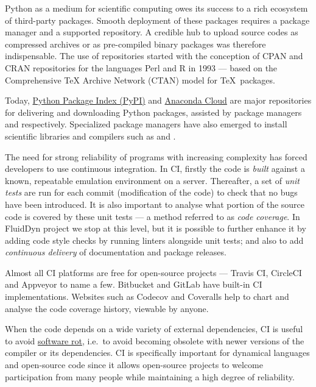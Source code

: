  Python
as a medium for scientific computing owes its success to a rich ecosystem of
third-party packages.  Smooth deployment of these packages requires a package
manager and a supported repository. A credible hub to upload source codes as
compressed archives or as pre-compiled binary packages was therefore
indispensable. The use of repositories started with the conception of CPAN and
CRAN repositories for the languages Perl and R in 1993 --- based on the
Comprehensive TeX Archive Network (CTAN) model for \TeX\ packages. 

Today, \href{https://pypi.org}{Python Package Index (PyPI)} and
\href{https://anaconda.org}{Anaconda Cloud} are major repositories for
delivering and downloading Python packages, assisted by package managers
 and  respectively.
Specialized package managers have also emerged to install scientific
libraries and compilers such as  and .

 The need for strong reliability of
programs with increasing complexity has forced developers to use continuous
integration.
%
In CI, firstly the code is \emph{built} against a known, repeatable emulation
environment on a server. Thereafter, a set of \emph{unit tests} are run for each
commit (modification of the code) to check that no bugs have been introduced. It
is also important to analyse what portion of the source code is covered by these
unit tests --- a method referred to as \emph{code coverage}. In FluidDyn project
we stop at this level, but it is possible to further enhance it by adding code
style checks by running linters alongside unit tests; and also to add
\emph{continuous delivery} of documentation and package releases.

Almost all CI platforms are free for open-source projects --- Travis CI,
CircleCI and Appveyor %
to name a few. Bitbucket and GitLab have built-in CI
implementations.  Websites such as Codecov and Coveralls help to chart and
analyse the code coverage history, viewable by anyone.

When the code depends on a wide variety of external dependencies, CI is useful
to avoid \href{https://en.wikipedia.org/wiki/Software\_rot}{software rot},
i.e.\ to avoid becoming obsolete with newer versions of the compiler or its
dependencies.  CI is specifically important for dynamical
languages and open-source code since it allows open-source projects to welcome
participation from many people while maintaining a high degree of reliability.

